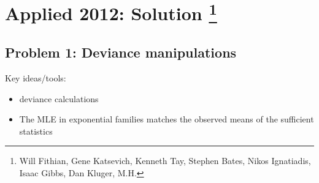 \section{Applied 2012: Solution \footnote{Will Fithian, Gene Katsevich, Kenneth Tay, Stephen Bates, Nikos Ignatiadis, Isaac Gibbs, Dan Kluger, M.H.}}

\subsection*{Problem 1: Deviance manipulations}
Key ideas/tools:
\begin{itemize}
\item deviance calculations
\item The MLE in exponential families matches the observed means of the sufficient statistics
\end{itemize}

